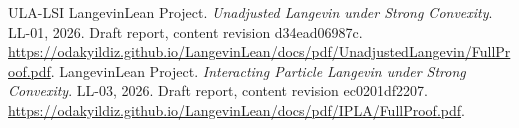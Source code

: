 \documentclass[11pt,a4paper]{article}
\begin{document}
\begin{thebibliography}{ULA-LSI}
LangevinLean Project. \emph{Unadjusted Langevin under Strong Convexity}. LL-01, 2026. Draft report, content revision d34ead06987c. \url{https://odakyildiz.github.io/LangevinLean/docs/pdf/UnadjustedLangevin/FullProof.pdf}.
LangevinLean Project. \emph{Interacting Particle Langevin under Strong Convexity}. LL-03, 2026. Draft report, content revision ec0201df2207. \url{https://odakyildiz.github.io/LangevinLean/docs/pdf/IPLA/FullProof.pdf}.
\end{thebibliography}
\end{document}
